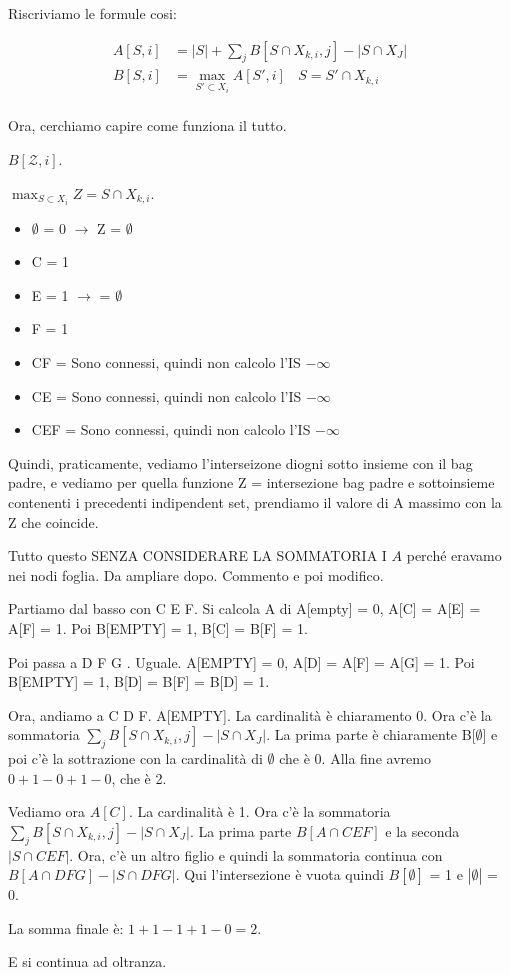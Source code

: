 Riscriviamo le formule cosi:

\begin{equation}
    \begin{aligned}
        A[S,i] &= |S| + \sum_{j} B[S \cap X_{k,i}, j] - |S \cap X_J| \\
        B[S,i] &= \max_{S' \subset X_i} A[S',i]  \ \ \ \ S = S' \cap X_{k,i} \\
    \end{aligned}
\end{equation}

Ora, cerchiamo capire come funziona il tutto.

$B[\mathcal{Z}, i]$.

$\max_{S \subset X_i} Z = S \cap X_{k,i}$.

\begin{itemize}
    \item $\emptyset$ = 0 $\rightarrow$ Z = $\emptyset$
    \item C = 1
    \item E = 1 $\rightarrow$  = $\emptyset$
    \item F = 1
    \item CF = Sono connessi, quindi non calcolo l'IS $- \infty$
    \item CE = Sono connessi, quindi non calcolo l'IS $- \infty$
    \item CEF = Sono connessi, quindi non calcolo l'IS $- \infty$
\end{itemize}

Quindi, praticamente, vediamo l'interseizone diogni sotto insieme con il bag padre, 
e vediamo per quella funzione Z = intersezione bag padre e sottoinsieme contenenti i precedenti indipendent set, prendiamo il valore
di A massimo con la Z che coincide.


Tutto questo SENZA CONSIDERARE LA SOMMATORIA I $A$ perché eravamo nei nodi foglia.
Da ampliare dopo. Commento e poi modifico.

Partiamo dal basso con C E F. Si calcola A di A[empty] = 0, A[C] = A[E] = A[F] = 1. 
Poi B[EMPTY] = 1, B[C] = B[F] = 1.

Poi passa a D F G . Uguale. A[EMPTY] = 0, A[D] = A[F] = A[G] = 1.
Poi B[EMPTY] = 1, B[D] = B[F] = B[D] = 1.

Ora, andiamo a C D F. 
A[EMPTY]. La cardinalità è chiaramento 0. Ora c'è la sommatoria $\sum_{j} B[S \cap X_{k,i}, j] - |S \cap X_J|$. La prima parte è chiaramente B[$\emptyset$] e poi c'è
la sottrazione con la cardinalità di $\emptyset$ che è 0. 
Alla fine avremo $0 + 1 - 0 + 1 - 0$, che è 2.

Vediamo ora $A[C]$. La cardinalità è 1. Ora c'è la sommatoria $\sum_{j} B[S \cap X_{k,i}, j] - |S \cap X_J|$. La prima parte $B[A \cap CEF]$ e la seconda $|S \cap CEF|$.
Ora, c'è un altro figlio e quindi la sommatoria continua con $B[A \cap DFG] - |S \cap DFG|$. Qui l'intersezione è vuota quindi $B[\emptyset]$ = 1 e $|\emptyset|$ = 0. 

La somma finale è: $1 + 1 - 1 +  1 - 0 = 2$.

E si continua ad oltranza.

